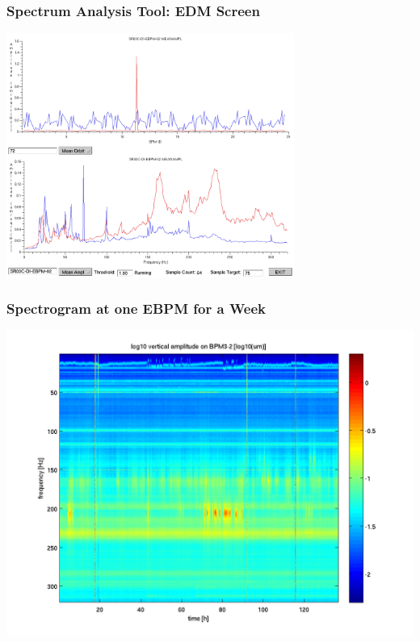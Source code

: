 \documentclass{beamer}
\begin{document}
\begin{frame}\frametitle{Spectrum Analysis Tool: EDM Screen}
\begin{center}
\includegraphics[height=80mm]{spectrum}
\end{center}
\end{frame}



\begin{frame}\frametitle{Spectrogram at one EBPM for a Week}
\includegraphics[width=\linewidth]{spectrogram-3-2}
\end{frame}

\end{document}
